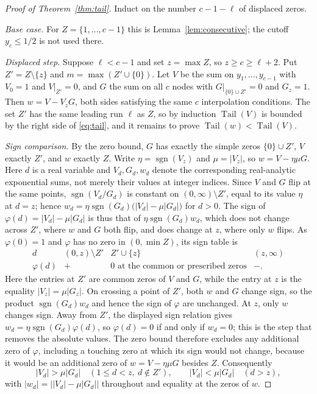 \documentclass[11pt]{article}
\DeclareMathOperator{\Tail}{Tail}
\DeclareMathOperator{\sgn}{sgn}
\begin{document}
\begin{proof}[Proof of Theorem~\ref{thm:tail}]
Induct on the number $c-1-\ell$ of displaced zeros.

\emph{Base case.}  For $Z=\{1,\ldots,c-1\}$ this is
Lemma~\ref{lem:consecutive}; the cutoff $y_c\le1/2$ is not used there.

\emph{Displaced step.}  Suppose $\ell<c-1$ and set $z=\max Z$, so
$z\ge c\ge\ell+2$.  Put $Z'=Z\setminus\{z\}$ and $m=\max(Z'\cup\{0\})$.  Let
$V$ be the sum on $y_1,\ldots,y_{c-1}$ with $V_0=1$ and $V|_{Z'}=0$, and $G$
the sum on all $c$ nodes with $G|_{\{0\}\cup Z'}=0$ and $G_z=1$.  Then
$w=V-V_zG$, both sides satisfying the same $c$ interpolation conditions.
The set $Z'$ has the same leading run $\ell$ as $Z$, so by induction
$\Tail(V)$ is bounded by the right side of \eqref{eq:tail}, and it remains
to prove $\Tail(w)<\Tail(V)$.

\emph{Sign comparison.}  By the zero bound, $G$ has exactly the simple zeros
$\{0\}\cup Z'$, $V$ exactly $Z'$, and $w$ exactly $Z$.  Write
$\eta=\sgn(V_z)$ and $\mu=|V_z|$, so $w=V-\eta\mu G$.  Here $d$ is a real
variable and $V_d,G_d,w_d$ denote the corresponding real-analytic
exponential sums, not merely their values at integer indices.  Since $V$ and $G$ flip
at the same points, $\sgn(V_d/G_d)$ is constant on $(0,\infty)\setminus Z'$,
equal to its value $\eta$ at $d=z$; hence
$w_d=\eta\sgn(G_d)\bigl(|V_d|-\mu|G_d|\bigr)$ for $d>0$.  The sign of
$\varphi(d)=|V_d|-\mu|G_d|$ is thus that of $\eta\sgn(G_d)w_d$, which does
not change across $Z'$, where $w$ and $G$ both flip, and does change at $z$,
where only $w$ flips.  As $\varphi(0)=1$ and $\varphi$ has no zero in
$(0,\min Z)$, its sign table is
\[
\begin{array}{c|ccc}
 d & (0,z)\setminus Z' & Z'\cup\{z\} & (z,\infty)\\ \hline
 \varphi(d) & + & 0\text{ at the common or prescribed zeros} & - .
\end{array}
\]
Here the entries at $Z'$ are common zeros of $V$ and $G$, while the entry at
$z$ is the equality $|V_z|=\mu|G_z|$.  On crossing a point of $Z'$, both
$w$ and $G$ change sign, so the product $\sgn(G_d)w_d$ and hence the sign of
$\varphi$ are unchanged.  At $z$, only $w$ changes sign.  Away from $Z'$,
the displayed sign relation gives
$w_d=\eta\sgn(G_d)\varphi(d)$, so $\varphi(d)=0$ if and only if $w_d=0$;
this is the step that removes the absolute values.  The zero bound therefore
excludes any additional zero of $\varphi$, including a touching zero at
which its sign would not change, because it would be an additional zero of
$w=V-\eta\mu G$ besides $Z$.
Consequently
\[
  |V_d|>\mu|G_d|\quad(1\le d<z,\ d\notin Z'),
  \qquad
  |V_d|<\mu|G_d|\quad(d>z),
\]
with $|w_d|=\bigl||V_d|-\mu|G_d|\bigr|$ throughout and equality at the
zeros of $w$.


\end{proof}
\end{document}

